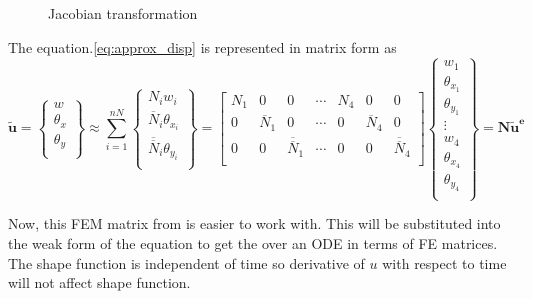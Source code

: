 \documentclass[main.tex]{subfiles}
\begin{document}
\begin{figure}[h!]
\centering


\caption{Jacobian transformation} 
\label{fig:JacTrans_quad}
\end{figure}

The equation.\ref{eq:approx_disp} is represented in matrix form as 
\begin{equation*}
\tilde{\mathbf{u}}= 
\left\{
\begin{array}{r}
w \\
\theta_x \\
\theta_y \\
\end{array} \right\}
\approx
\sum_{i=1}^{nN}
\left\{
\begin{array}{r}
N_i w_i \\
\overline{N}_i \theta_{x_i} \\
\overline{\overline{N}}_i \theta_{y_i} \\
\end{array} \right\}
=
\begin{bmatrix}
N_1 & 0 & 0  & \cdots & N_{4} & 0 & 0 \\
0 & \overline{N}_1 & 0  & \cdots & 0 & \overline{N}_{4} & 0 \\
0 & 0 & \overline{\overline{N}}_1 & \cdots & 0 & 0 & \overline{\overline{N}}_{4} \\
\end{bmatrix}
\left\{
\begin{array}{r}
w_1 \\
\theta_{x_1} \\
\theta_{y_1} \\
\vdots \\
w_{4} \\
\theta_{x_{4}} \\
\theta_{y_{4}} \\
\end{array} \right\}
=
\mathbf{N} \mathbf{\tilde{u}^e} 
\end{equation*}

Now, this FEM matrix from is easier to work with. This will be substituted into the weak form of the equation to get the over an ODE in terms of FE matrices. The shape function is independent of time so derivative of $u$ with respect to time will not affect shape function.
\end{document}
